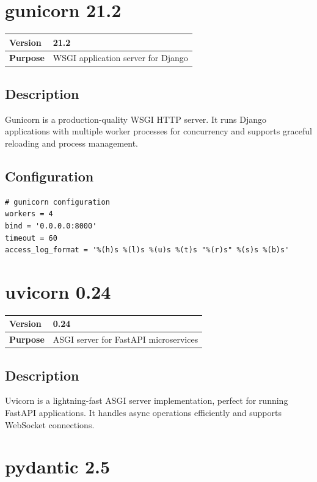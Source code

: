 \documentclass[12pt,a4paper]{report}
\begin{document}
\section{gunicorn 21.2}

\begin{tabular}{|p{4cm}|p{10cm}|}
\hline
\textbf{Version} & 21.2 \\
\hline
\textbf{Purpose} & WSGI application server for Django \\
\hline
\end{tabular}

\subsection{Description}

Gunicorn is a production-quality WSGI HTTP server. It runs Django applications with multiple worker processes for concurrency and supports graceful reloading and process management.

\subsection{Configuration}

\begin{lstlisting}
# gunicorn configuration
workers = 4
bind = '0.0.0.0:8000'
timeout = 60
access_log_format = '%(h)s %(l)s %(u)s %(t)s "%(r)s" %(s)s %(b)s'
\end{lstlisting}

\section{uvicorn 0.24}

\begin{tabular}{|p{4cm}|p{10cm}|}
\hline
\textbf{Version} & 0.24 \\
\hline
\textbf{Purpose} & ASGI server for FastAPI microservices \\
\hline
\end{tabular}

\subsection{Description}

Uvicorn is a lightning-fast ASGI server implementation, perfect for running FastAPI applications. It handles async operations efficiently and supports WebSocket connections.

\section{pydantic 2.5}
\end{document}
